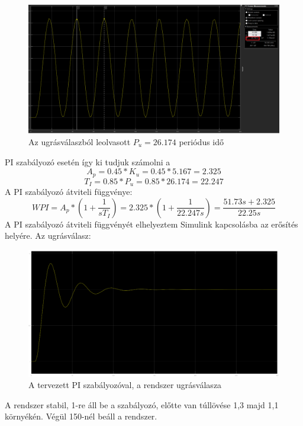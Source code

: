 \documentclass[12pt]{article}
\begin{document}
\begin{figure}[H]
\centering
\includegraphics[scale=.30]{ZNSKPERIOD}
\caption{Az ugrásválaszból leolvasott $P_u=26.174$ periódus idő}
\end{figure}
PI szabályozó esetén így ki tudjuk számolni a 
\[A_p=0.45*K_u=0.45*5.167=2.325 \]
\[T_I=0.85*P_u=0.85*26.174=22.247 \]
A PI szabályozó átviteli függvénye:
\[WPI=A_p*(1+\frac{1}{sT_I})=2.325*(1+\frac{1}{22.247s})=\frac{51.73s+2.325}{22.25s}\]
A PI szabályozó átviteli függvényét elhelyeztem Simulink kapcsolásba az erősítés helyére.
Az ugrásválasz:
\begin{figure}[H]
\centering
\includegraphics[scale=.30]{ZNSKUPI}
\caption{A tervezett PI szabályozóval, a rendszer ugrásválasza}
\end{figure}
A rendszer stabil, 1-re áll be a szabályozó, előtte van túllövése 1,3 majd 1,1 környékén. Végül 150-nél beáll a rendszer.
\end{document}
